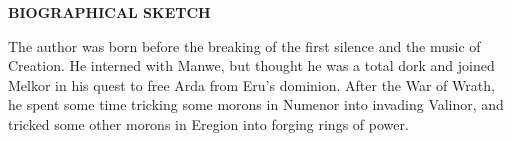 \begin{centering}
\textbf{BIOGRAPHICAL SKETCH}\\
\vspace{\baselineskip}
\end{centering}

The author was born before the breaking of the first silence and the music of Creation. He interned with Manwe, but thought he
was a total dork and joined Melkor in his quest to free Arda from Eru's dominion. After the War of Wrath,
he spent some time tricking some morons in Numenor into invading Valinor, and tricked some other
morons in Eregion into forging rings of power.
